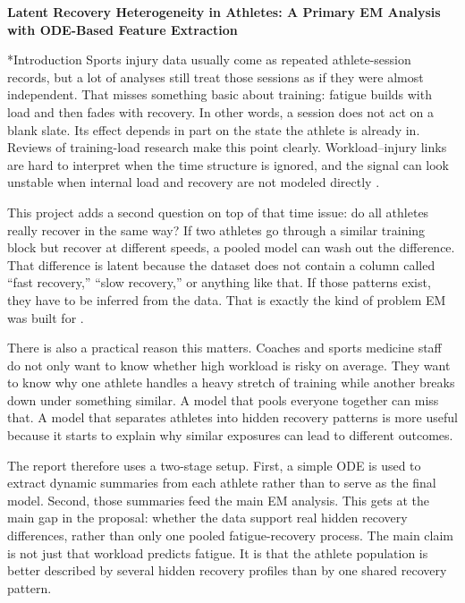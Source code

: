 \documentclass[11pt]{article}
\makeatletter
\renewcommand\section{\@startsection{section}{1}{0pt}{0.38em}{0.14em}{\bfseries\normalsize}}
\makeatother
\begin{document}
\begin{center}
{\large \textbf{Latent Recovery Heterogeneity in Athletes: A Primary EM Analysis with ODE-Based Feature Extraction}}
\end{center}

\section*{Introduction}
Sports injury data usually come as repeated athlete-session records, but a lot of analyses still treat those sessions as if they were almost independent. That misses something basic about training: fatigue builds with load and then fades with recovery. In other words, a session does not act on a blank slate. Its effect depends in part on the state the athlete is already in. Reviews of training-load research make this point clearly. Workload--injury links are hard to interpret when the time structure is ignored, and the signal can look unstable when internal load and recovery are not modeled directly \cite{Impellizzeri2020,Imbach2022}. 

This project adds a second question on top of that time issue: do all athletes really recover in the same way? If two athletes go through a similar training block but recover at different speeds, a pooled model can wash out the difference. That difference is latent because the dataset does not contain a column called ``fast recovery,'' ``slow recovery,'' or anything like that. If those patterns exist, they have to be inferred from the data. That is exactly the kind of problem EM was built for \cite{Dempster1977}. 

There is also a practical reason this matters. Coaches and sports medicine staff do not only want to know whether high workload is risky on average. They want to know why one athlete handles a heavy stretch of training while another breaks down under something similar. A model that pools everyone together can miss that. A model that separates athletes into hidden recovery patterns is more useful because it starts to explain why similar exposures can lead to different outcomes.

The report therefore uses a two-stage setup. First, a simple ODE is used to extract dynamic summaries from each athlete rather than to serve as the final model. Second, those summaries feed the main EM analysis. This gets at the main gap in the proposal: whether the data support real hidden recovery differences, rather than only one pooled fatigue-recovery process. The main claim is not just that workload predicts fatigue. It is that the athlete population is better described by several hidden recovery profiles than by one shared recovery pattern.
\end{document}
